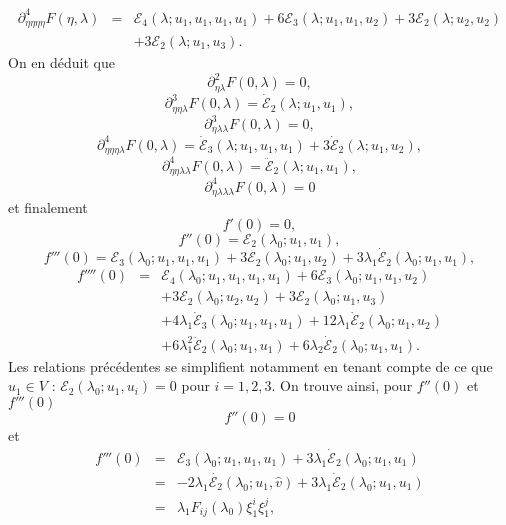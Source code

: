 \documentclass{article}
\begin{document}
\begin{eqnarray}
  \partial_{\eta  \eta  \eta  \eta}^4 F (\eta,
  λ) & = & \mathcal{E}_4 (λ ; u_1, u_1, u_1, u_1) + 6\mathcal{E}_3
  (λ ; u_1, u_1, u_2) + 3\mathcal{E}_2 (λ ; u_2, u_2) \nonumber\\
  &  &  + 3\mathcal{E}_2 (λ ; u_1, u_3) . \nonumber
\end{eqnarray}
On en déduit que
\[ \partial_{\eta  λ}^2 F (0, λ) = 0, \]
\[ \partial_{\eta  \eta  λ}^3 F (0, λ) =
   \dot{\mathcal{E}}_2 (λ ; u_1, u_1), \]
\[ \partial_{\eta  λ  λ}^3 F (0, λ) = 0, \]
\[ \partial_{\eta  \eta  \eta  λ}^4 F (0,
   λ) = \dot{\mathcal{E}}_3 (λ ; u_1, u_1, u_1) + 3
   \dot{\mathcal{E}}_2 (λ ; u_1, u_2), \text{} \text{} \]
\[ \partial_{\eta  \eta  λ  λ}^4 F (0,
   λ) = \ddot{\mathcal{E}}_2 (λ ; u_1, u_1), \]
\[ \partial_{\eta  λ  λ  λ}^4 F (0,
   λ) = 0 \]
et finalement
\[ f' (0) = 0, \]
\[ f'' (0) =\mathcal{E}_2 (λ_0 ; u_1, u_1), \]
\[ f''' (0) =\mathcal{E}_3 (λ_0 ; u_1, u_1, u_1) + 3\mathcal{E}_2
   (λ_0 ; u_1, u_2) + 3 λ_1  \dot{\mathcal{E}}_2 (λ_0 ; u_1,
   u_1), \]
\begin{eqnarray}
  f'''' (0) & = & \mathcal{E}_4 (λ_0 ; u_1, u_1, u_1, u_1) +
  6\mathcal{E}_3 (λ_0 ; u_1, u_1, u_2) \nonumber\\
  &  &  + 3\mathcal{E}_2 (λ_0 ; u_2, u_2) + 3\mathcal{E}_2
  (λ_0 ; u_1, u_3) \nonumber\\
  &  &  + 4 λ_1  \dot{\mathcal{E}}_3 (λ_0 ; u_1, u_1,
  u_1) + 12 λ_1  \dot{\mathcal{E}}_2 (λ_0 ; u_1, u_2) \nonumber\\
  &  &  + 6 λ_1^2  \ddot{\mathcal{E}}_2 (λ_0 ; u_1, u_1)
  + 6 λ_2  \dot{\mathcal{E}}_2 (λ_0 ; u_1, u_1) . \nonumber
\end{eqnarray}
Les relations précédentes se simplifient notamment en tenant compte de
ce que $u_1 \in V$ : $\mathcal{E}_2 (λ_0 ; u_1, u_i) = 0$ pour $i = 1,
2, 3$. On trouve ainsi, pour $f'' (0)$ et $f''' (0)$
\begin{equation}
  \label{eq:DL energie derivee 2nde} f'' (0) = 0
\end{equation}
et
\begin{eqnarray}
  f''' (0) & = & \mathcal{E}_3 (λ_0 ; u_1, u_1, u_1) + 3 λ_1
  \dot{\mathcal{E}}_2 (λ_0 ; u_1, u_1) \nonumber\\
  & = & - 2 λ_1  \dot{\mathcal{E}_2} (λ_0 ; u_1, \hat{v}) + 3
  λ_1  \dot{\mathcal{E}}_2 (λ_0 ; u_1, u_1) \nonumber\\
  & = & λ_1 F_{i  j} (λ_0) \xi_1^i \xi_1^j,  \label{eq:DL
  energie derivee 3ieme}
\end{eqnarray}
\end{document}
